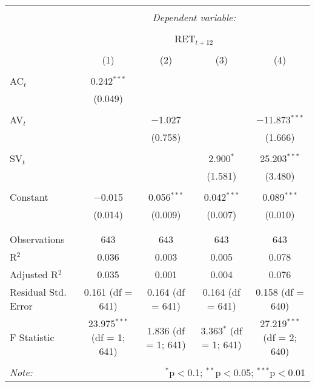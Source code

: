 
\begin{table}[!htbp] \centering 
  \caption{} 
  \label{} 
\begin{tabular}{@{\extracolsep{5pt}}lcccc} 
\\[-1.8ex]\hline 
\hline \\[-1.8ex] 
 & \multicolumn{4}{c}{\textit{Dependent variable:}} \\ 
\cline{2-5} 
\\[-1.8ex] & \multicolumn{4}{c}{RET$_{t+12}$} \\ 
\\[-1.8ex] & (1) & (2) & (3) & (4)\\ 
\hline \\[-1.8ex] 
 AC$_{t}$ & 0.242$^{***}$ &  &  &  \\ 
  & (0.049) &  &  &  \\ 
  & & & & \\ 
 AV$_{t}$ &  & $-$1.027 &  & $-$11.873$^{***}$ \\ 
  &  & (0.758) &  & (1.666) \\ 
  & & & & \\ 
 SV$_{t}$ &  &  & 2.900$^{*}$ & 25.203$^{***}$ \\ 
  &  &  & (1.581) & (3.480) \\ 
  & & & & \\ 
 Constant & $-$0.015 & 0.056$^{***}$ & 0.042$^{***}$ & 0.089$^{***}$ \\ 
  & (0.014) & (0.009) & (0.007) & (0.010) \\ 
  & & & & \\ 
\hline \\[-1.8ex] 
Observations & 643 & 643 & 643 & 643 \\ 
R$^{2}$ & 0.036 & 0.003 & 0.005 & 0.078 \\ 
Adjusted R$^{2}$ & 0.035 & 0.001 & 0.004 & 0.076 \\ 
Residual Std. Error & 0.161 (df = 641) & 0.164 (df = 641) & 0.164 (df = 641) & 0.158 (df = 640) \\ 
F Statistic & 23.975$^{***}$ (df = 1; 641) & 1.836 (df = 1; 641) & 3.363$^{*}$ (df = 1; 641) & 27.219$^{***}$ (df = 2; 640) \\ 
\hline 
\hline \\[-1.8ex] 
\textit{Note:}  & \multicolumn{4}{r}{$^{*}$p$<$0.1; $^{**}$p$<$0.05; $^{***}$p$<$0.01} \\ 
\end{tabular} 
\end{table} 
